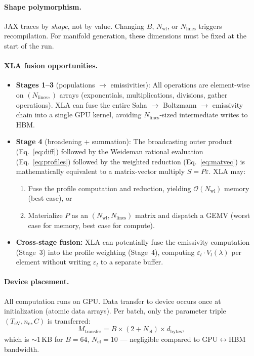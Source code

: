\documentclass[11pt]{article}
\newcommand{\TeV}{T_\mathrm{eV}}
\newcommand{\ne}{n_\mathrm{e}}
\begin{document}
\paragraph{Shape polymorphism.}
JAX traces by \emph{shape}, not by value. Changing $B$, $N_\mathrm{wl}$, or
$N_\mathrm{lines}$ triggers recompilation. For manifold generation, these
dimensions must be fixed at the start of the run.

\paragraph{XLA fusion opportunities.}
\begin{itemize}
  \item \textbf{Stages 1--3} (populations $\to$ emissivities):
    All operations are element-wise on $(N_\mathrm{lines},)$ arrays
    (exponentials, multiplications, divisions, gather operations).
    XLA can fuse the entire Saha $\to$ Boltzmann $\to$ emissivity chain
    into a single GPU kernel, avoiding $N_\mathrm{lines}$-sized
    intermediate writes to HBM.
  \item \textbf{Stage 4} (broadening + summation):
    The broadcasting outer product (Eq.~\ref{eq:diff}) followed by
    the Weideman rational evaluation (Eq.~\ref{eq:profiles}) followed by
    the weighted reduction (Eq.~\ref{eq:matvec}) is mathematically
    equivalent to a matrix-vector multiply $S = P\varepsilon$.
    XLA may:
    \begin{enumerate}
      \item Fuse the profile computation and reduction, yielding
        $\mathcal{O}(N_\mathrm{wl})$ memory (best case), or
      \item Materialize $P$ as an $(N_\mathrm{wl}, N_\mathrm{lines})$ matrix
        and dispatch a GEMV (worst case for memory, best case for compute).
    \end{enumerate}
  \item \textbf{Cross-stage fusion:}
    XLA can potentially fuse the emissivity computation (Stage~3) into
    the profile weighting (Stage~4), computing
    $\varepsilon_l \cdot V_l(\lambda)$ per element without writing
    $\varepsilon_l$ to a separate buffer.
\end{itemize}

\paragraph{Device placement.}
All computation runs on GPU. Data transfer to device occurs once at
initialization (atomic data arrays). Per batch, only the parameter
triple $(\TeV, \ne, C)$ is transferred:
\begin{equation}
  M_\mathrm{transfer} = B \times (2 + N_\mathrm{el}) \times d_\mathrm{bytes},
\end{equation}
which is $\sim$1\,KB for $B = 64$, $N_\mathrm{el} = 10$ --- negligible
compared to GPU$\leftrightarrow$HBM bandwidth.
\end{document}
